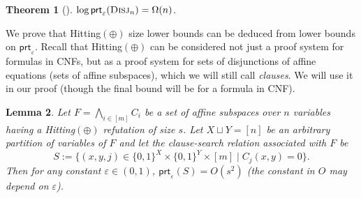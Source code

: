 \documentclass[11pt]{article}
\newcommand{\scterm}[1]{{\textrm{\sc #1}}}
\newcommand{\hit}{\scterm{Hitting}}
\newcommand{\hitp}{{\hit}$(\oplus)$}
\newcommand{\prt}{\mathsf{prt}}
\newcommand{\disj}{\scterm{Disj}}
\numberwithin{equation}{section}
\newtheorem{theorem}{Theorem}[section]
\newtheorem{lemma}[theorem]{Lemma}
\begin{document}
\begin{theorem}[\cite{Raz92, JK10}] \label{th:prt-disj-lb}
$\log \prt_\varepsilon(\disj_n) = \Omega(n)$.
\end{theorem}

We prove that {\hitp} size lower bounds can be deduced from lower bounds on $\prt_\varepsilon$.
Recall that {\hitp} can be considered not just a proof system for formulas in CNFs,
but as a proof system for sets of disjunctions of affine equations (sets of affine subspaces),
which we will still call \emph{clauses}.
We will use it in our proof (though the final bound will be for a formula in CNF).

\begin{lemma}
\label{lem:hitting-xor-reduction}
    Let $F = \bigwedge_{i \in [m]} C_i$ be a set of affine subspaces over $n$ variables having a {\hitp} refutation of size $s$. Let $X \sqcup Y = [n]$ be an arbitrary partition of variables of $F$ and let the clause-search relation associated with $F$ be \[S := \{(x,y,j) \in \{0,1\}^X \times \{0,1\}^Y \times [m] \mid C_j(x,y) = 0\}.\] Then for any constant $\varepsilon\in(0,1)$, $\prt_{\varepsilon} (S) = O(s^2)$ (the constant in $O$ may depend on $\varepsilon$).
\end{lemma}
\end{document}
